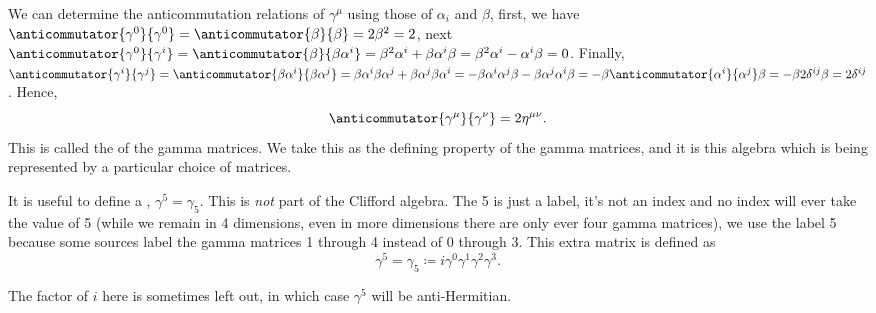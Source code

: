 \documentclass[fleqn]{NotesClass}
\newcommand{\minkowskiMetric}{\eta}
\begin{document}
    We can determine the anticommutation relations of \(\gamma^\mu\) using those of \(\alpha_i\) and \(\beta\), first, we have \(\anticommutator{\gamma^0}{\gamma^0} = \anticommutator{\beta}{\beta} = 2\beta^2 = 2\), next \(\anticommutator{\gamma^0}{\gamma^i} = \anticommutator{\beta}{\beta\alpha^i} = \beta^2\alpha^i + \beta\alpha^i\beta = \beta^2\alpha^i - \alpha^i\beta = 0\).
    Finally, \(\anticommutator{\gamma^i}{\gamma^j} = \anticommutator{\beta\alpha^i}{\beta\alpha^j} = \beta\alpha^i\beta\alpha^j + \beta\alpha^j\beta\alpha^i = -\beta\alpha^i\alpha^j\beta - \beta\alpha^j\alpha^i\beta = -\beta\anticommutator{\alpha^i}{\alpha^j}\beta = -\beta 2\delta^{ij} \beta = 2\delta^{ij} \).
    Hence,
    \begin{equation}
        \anticommutator{\gamma^\mu}{\gamma^\nu} = 2\minkowskiMetric^{\mu\nu}.
    \end{equation}
    This is called the  of the gamma matrices.
    We take this as the defining property of the gamma matrices, and it is this algebra which is being represented by a particular choice of matrices.
    
    It is useful to define a , \(\gamma^5 = \gamma_5\).
    This is \emph{not} part of the Clifford algebra.
    The 5 is just a label, it's not an index and no index will ever take the value of 5 (while we remain in 4 dimensions, even in more dimensions there are only ever four gamma matrices), we use the label 5 because some sources label the gamma matrices 1 through 4 instead of 0 through 3.
    This extra matrix is defined as
    \begin{equation}
        \gamma^5 = \gamma_5 \coloneqq i\gamma^0\gamma^1\gamma^2\gamma^3.
    \end{equation}
    \begin{wrn}
        The factor of \(i\) here is sometimes left out, in which case \(\gamma^5\) will be anti-Hermitian.
    \end{wrn}
    
\end{document}
